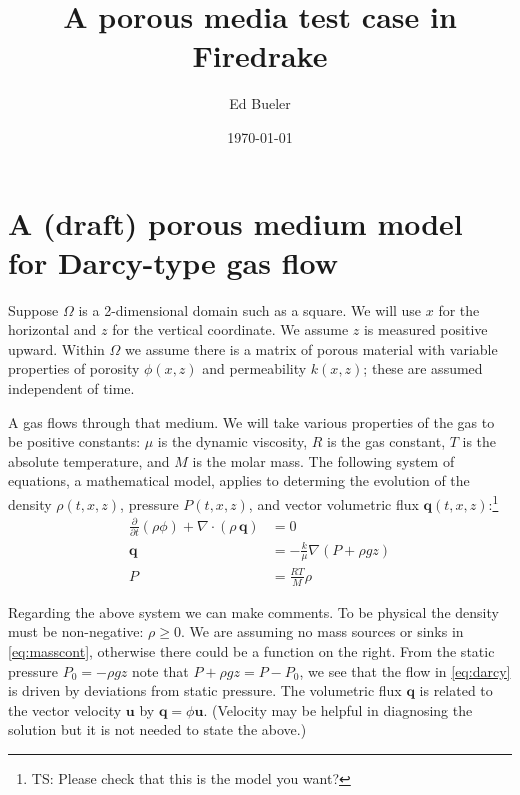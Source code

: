 \documentclass[11pt]{article}
\title{A porous media test case in Firedrake}
\author{Ed Bueler}
\date{\today}
\newcommand{\bq}{\mathbf{q}}
\newcommand{\bu}{\mathbf{u}}
\newcommand{\Div}{\nabla\cdot}
\newcommand{\grad}{\nabla}
\begin{document}
\maketitle

\thispagestyle{empty}

\section{A (draft) porous medium model for Darcy-type gas flow}

Suppose $\Omega$ is a 2-dimensional domain such as a square.  We will use $x$ for the horizontal and $z$ for the vertical coordinate.  We assume $z$ is measured positive upward.  Within $\Omega$ we assume there is a matrix of porous material with variable properties of porosity $\phi(x,z)$ and permeability $k(x,z)$; these are assumed independent of time.

A gas flows through that medium.  We will take various properties of the gas to be positive constants: $\mu$ is the dynamic viscosity, $R$ is the gas constant, $T$ is the absolute temperature, and $M$ is the molar mass.  The following system of equations, a mathematical model, applies to determing the evolution of the density $\rho(t,x,z)$, pressure $P(t,x,z)$, and vector volumetric flux $\bq(t,x,z)$:\footnote{TS: Please check that this is the model you want?}
\begin{subequations}
\label{eq:pmtime:early}
\begin{align}
\frac{\partial}{\partial t} \left(\rho \phi\right) + \Div \left(\rho\, \bq\right) &= 0 \label{eq:masscont} \\
\bq &= - \frac{k}{\mu} \grad\left(P + \rho g z\right) \label{eq:darcy} \\
P &= \frac{RT}{M} \rho \label{eq:idealgas}
\end{align}
\end{subequations}

Regarding the above system we can make comments.  To be physical the density must be non-negative: $\rho\ge 0$.  We are assuming no mass sources or sinks in \eqref{eq:masscont}, otherwise there could be a function on the right.  From the static pressure $P_0=-\rho g z$ note that $P+\rho g z = P-P_0$, we see that the flow in \eqref{eq:darcy} is driven by deviations from static pressure.  The volumetric flux $\bq$ is related to the vector velocity $\bu$ by $\bq = \phi \bu$.  (Velocity may be helpful in diagnosing the solution but it is not needed to state the above.)
\end{document}
